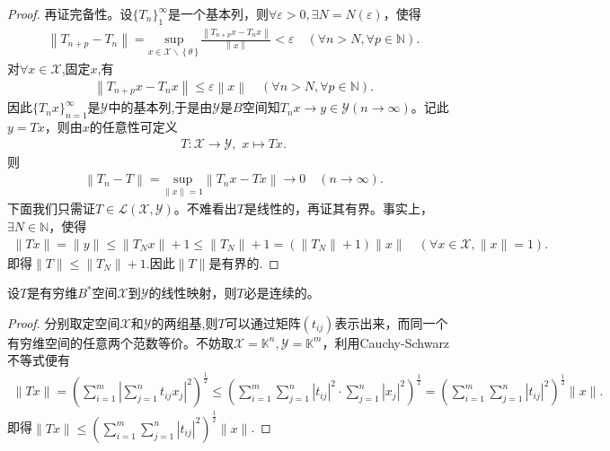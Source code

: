 \documentclass[../../main.tex]{subfiles}%
\begin{document}
\begin{proof}
再证完备性。设$\{T_n\}_1^\infty$是一个基本列，则$\forall \varepsilon>0,\exists N=N(\varepsilon)$，使得
\begin{align*}
\left\| T_{n+p}-T_n \right\| =\underset{x\in \mathscr{X} \backslash \left\{ \theta \right\}}{\mathrm{sup}}\frac{\left\| T_{n+p}x-T_nx \right\|}{\left\| x \right\|}<\varepsilon \quad (\forall n>N,\forall p\in \mathbb{N} ).
\end{align*}
对$\forall x\in\mathscr{X}$,固定$x$,有
\begin{align*}
\left\| T_{n+p}x-T_nx \right\| \leqslant \varepsilon \left\| x \right\| \quad (\forall n>N,\forall p\in \mathbb{N} ).
\end{align*}
因此$\{T_nx\}_{n=1}^{\infty}$是$\mathscr{Y}$中的基本列,于是由$\mathscr{Y}$是$B$空间知$T_nx\to y\in\mathscr{Y}(n\to\infty)$。记此$y=Tx$，则由$x$的任意性可定义
\begin{align*}
T:\mathscr{X}\to \mathscr{Y},\,\,x\mapsto Tx.
\end{align*}
则
\begin{align*}
\left\| T_n-T \right\| =\underset{\left\| x \right\| =1}{\mathrm{sup}}\left\| T_nx-Tx \right\| \rightarrow 0\quad \left( n\rightarrow \infty \right) .
\end{align*}
下面我们只需证$T\in\mathscr{L}(\mathscr{X},\mathscr{Y})$。不难看出$T$是线性的，再证其有界。事实上，$\exists N\in\mathbb{N}$，使得
\begin{align*}
\|Tx\|=\|y\|\leqslant \|T_Nx\|+1\leqslant \|T_N\|+1=(\|T_N\|+1)\|x\|\quad (\forall x\in\mathscr{X},\|x\|=1).
\end{align*}
即得$\|T\|\leqslant \|T_N\|+1$.因此$\|T\|$是有界的.
\end{proof}

\begin{proposition}[有限维赋范空间上的线性映射必连续]\label{proposition:有限维赋范空间上的线性映射必连续}
设$T$是有穷维$B^*$空间$\mathscr{X}$到$\mathscr{Y}$的线性映射，则$T$必是连续的。
\end{proposition}
\begin{proof}
分别取定空间$\mathscr{X}$和$\mathscr{Y}$的两组基,则$T$可以通过矩阵$(t_{ij})$表示出来，而同一个有穷维空间的任意两个范数等价。不妨取$\mathscr{X}=\mathbb{K}^n,\mathscr{Y}=\mathbb{K}^m$，利用Cauchy-Schwarz不等式便有
\begin{align*}
\|Tx\|=\left( \sum\limits_{i=1}^m \left| \sum\limits_{j=1}^n t_{ij}x_j \right|^2 \right)^{\frac{1}{2}}
\leqslant \left( \sum\limits_{i=1}^m \sum\limits_{j=1}^n |t_{ij}|^2 \cdot \sum\limits_{j=1}^n |x_j|^2 \right)^{\frac{1}{2}}
=\left( \sum\limits_{i=1}^m \sum\limits_{j=1}^n |t_{ij}|^2 \right)^{\frac{1}{2}} \|x\|.
\end{align*}
即得$\|Tx\|\leqslant \left( \sum\limits_{i=1}^m \sum\limits_{j=1}^n |t_{ij}|^2 \right)^{\frac{1}{2}} \|x\|$.
\end{proof}
\end{document}
